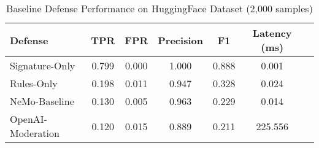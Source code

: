 \begin{table}[t]
\centering
\caption{Baseline Defense Performance on HuggingFace Dataset (2,000 samples)}
\label{tab:phase1-baselines}
\begin{tabular}{lcccccc}
\hline
\textbf{Defense} & \textbf{TPR} & \textbf{FPR} & \textbf{Precision} & \textbf{F1} & \textbf{Latency (ms)} \\
\hline
Signature-Only & 0.799 & 0.000 & 1.000 & 0.888 & 0.001 \\
Rules-Only & 0.198 & 0.011 & 0.947 & 0.328 & 0.024 \\
NeMo-Baseline & 0.130 & 0.005 & 0.963 & 0.229 & 0.014 \\
OpenAI-Moderation & 0.120 & 0.015 & 0.889 & 0.211 & 225.556 \\
\hline
\end{tabular}
\end{table}